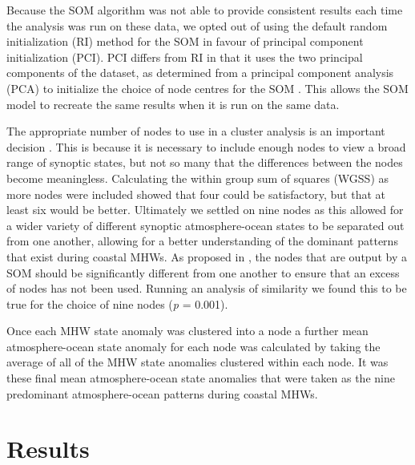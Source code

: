 \documentclass[utf8]{frontiersSCNS}
\begin{document}
Because the SOM algorithm was not able to provide consistent results each time the analysis was run on these data, we opted out of using the default random initialization (RI) method for the SOM in favour of principal component initialization (PCI). PCI differs from RI in that it uses the two principal components of the dataset, as determined from a principal component analysis (PCA) to initialize the choice of node centres for the SOM \citep{Akinduko2016}. This allows the SOM model to recreate the same results when it is run on the same data.

The appropriate number of nodes to use in a cluster analysis is an important decision \citep{Gibson2016a}. This is because it is necessary to include enough nodes to view a broad range of synoptic states, but not so many that the differences between the nodes become meaningless. Calculating the within group sum of squares (WGSS) as more nodes were included showed that four could be satisfactory, but that at least six would be better. Ultimately we settled on nine nodes as this allowed for a wider variety of different synoptic atmosphere-ocean states to be separated out from one another, allowing for a better understanding of the dominant patterns that exist during coastal MHWs. As proposed in \citet{Johnson2013}, the nodes that are output by a SOM should be significantly different from one another to ensure that an excess of nodes has not been used. Running an analysis of similarity we found this to be true for the choice of nine nodes (\emph{p} = 0.001).

Once each MHW state anomaly was clustered into a node a further mean atmosphere-ocean state anomaly for each node was calculated by taking the average of all of the MHW state anomalies clustered within each node. It was these final mean atmosphere-ocean state anomalies that were taken as the nine predominant atmosphere-ocean patterns during coastal MHWs.

\section{Results}
\end{document}
